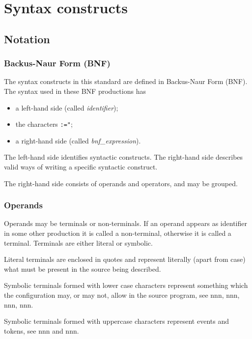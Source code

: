 \chapter{Syntax constructs}\label{syntax-constructs}

\section{Notation}\label{notation}

\subsection{Backus-Naur Form (BNF)}\label{backus-naur-form-bnf}

The syntax constructs in this standard are defined in Backus-Naur Form
(BNF). The syntax used in these BNF productions has

\begin{itemize}
\item
  a left-hand side (called \emph{identifier});
\item
  the characters \texttt{\textquotesingle{}:="};
\item
  a right-hand side (called \emph{bnf\_expression}).
\end{itemize}

The left-hand side identifies syntactic constructs. The right-hand side
describes valid ways of writing a specific syntactic construct.

The right-hand side consists of operands and operators, and may be
grouped.

\subsection{Operands}\label{operands}

Operands may be terminals or non-terminals. If an operand appears as
identifier in some other production it is called a non-terminal,
otherwise it is called a terminal. Terminals are either literal or
symbolic.

Literal terminals are enclosed in quotes and represent literally (apart
from case) what must be present in the source being described.

Symbolic terminals formed with lower case characters represent something
which the configuration may, or may not, allow in the source program,
see nnn, nnn, nnn, nnn.

Symbolic terminals formed with uppercase characters represent events and
tokens, see nnn and nnn.

